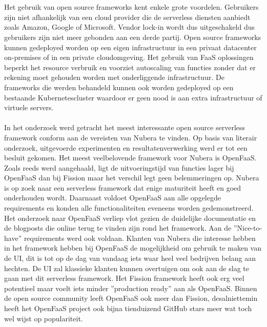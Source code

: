 \\\\
Het gebruik van open source frameworks kent enkele grote voordelen. Gebruikers zijn niet afhankelijk van een cloud provider die de serverless diensten aanbiedt zoals Amazon, Google of Microsoft. Vendor lock-in wordt dus uitgeschakeld dus gebruikers zijn niet meer gebonden aan een derde partij. Open source frameworks kunnen gedeployed worden op een eigen infrastructuur in een privaat datacenter on-premises of in een private cloudomgeving. Het gebruik van FaaS oplossingen beperkt het resource verbruik en voorziet autoscaling van functies zonder dat er rekening moet gehouden worden met onderliggende infrastructuur. De frameworks die werden behandeld kunnen ook worden gedeployed op een bestaande Kubernetescluster waardoor er geen nood is aan extra infrastructuur of virtuele servers.
\\\\
In het onderzoek werd getracht het meest interessante open source serverless framework conform aan de vereisten van Nubera te vinden. Op basis van literair onderzoek, uitgevoerde experimenten en resultatenverwerking werd er tot een besluit gekomen. Het meest veelbelovende framework voor Nubera is OpenFaaS. Zoals reeds werd aangehaald, ligt de uitvoeringstijd van functies lager bij OpenFaaS dan bij Fission maar het verschil legt geen belemmeringen op. Nubera is op zoek naar een serverless framework dat enige maturiteit heeft en goed onderhouden wordt. Daarnaast voldoet OpenFaaS aan alle opgelegde requirements en konden alle functionaliteiten eveneens worden gedemonstreerd. Het onderzoek naar OpenFaaS verliep vlot gezien de duidelijke documentatie en de blogposts die online terug te vinden zijn rond het framework. Aan de ''Nice-to-have'' requirements werd ook voldaan. Klanten van Nubera die interesse hebben in het framework hebben bij OpenFaaS de mogelijkheid om gebruik te maken van de UI, dit is tot op de dag van vandaag iets waar heel veel bedrijven belang aan hechten. De UI zal klassieke klanten kunnen overtuigen om ook aan de slag te gaan met dit serverless framework. Het Fission framework heeft ook erg veel potentieel maar voelt iets minder ''production ready'' aan als OpenFaaS. Binnen de open source community leeft OpenFaaS ook meer dan Fission, desalniettemin heeft het OpenFaaS project ook bijna tienduizend GitHub stars meer wat toch wel wijst op populariteit.
\\\\
